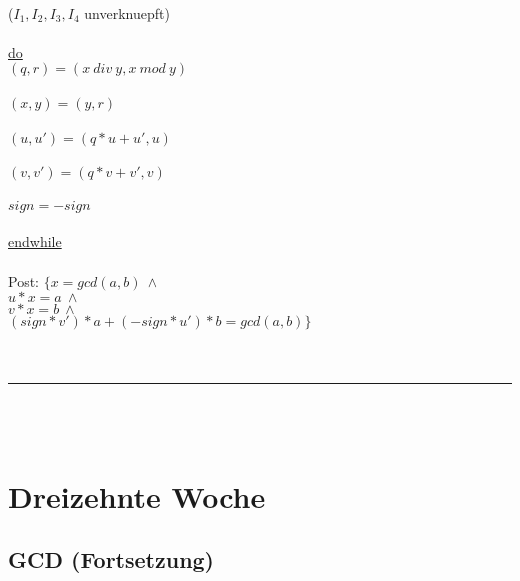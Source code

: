 \documentclass[18pt,a4paper]{article}
\newcommand{\tab}{\hspace*{2em}}
\begin{document}
\\
\tab \tab($I_1, I_2, I_3, I_4$ unverknuepft)\\
\\
\uline{do}\\
\tab$(q,r) = (x\: div \:y, x\: mod\: y)$\\
\\
\tab$(x,y) = (y,r)$\\
\\
\tab$(u,u') = (q*u + u', u)$\\
\\
\tab$(v,v') = (q*v + v', v)$\\
\\
\tab$sign = -sign$\\
\\
\uline{endwhile}\\
\\
Post: $\{ x = gcd(a,b)\: \wedge $\\
\tab\tab $u*x = a\: \wedge$\\
\tab\tab $v*x = b\: \wedge$\\
\tab\tab $(sign *v')*a + (-sign*u')*b  = gcd(a,b) \}$\\
\\
\\
\rule{\textwidth}{0.4mm}\\
\\

\section{Dreizehnte Woche}

\subsection{GCD (Fortsetzung)}
\end{document}
